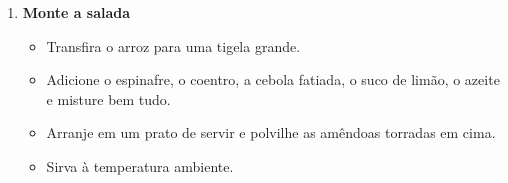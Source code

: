 \documentclass [11pt, letterpaper] {article}
\begin{document}
\begin {description}
\begin {enumerate}
\item {\bf Monte a salada}
\begin {itemize}
\item Transfira o arroz para uma tigela grande.
\item Adicione o espinafre, o coentro, a cebola fatiada, o suco de limão, o azeite e misture bem tudo.
\item Arranje em um prato de servir e polvilhe as amêndoas torradas em cima.
\item Sirva à temperatura ambiente.
\end {itemize}

\end {enumerate}
\end {description}
\end{document}
